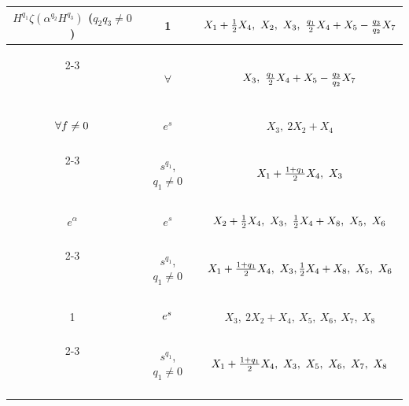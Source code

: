 \begin{center}
\begin{tabular}{|c|c|c|}
\hline


%


$H^{q_1}\zeta(\alpha^{q_2}H^{q_3})$ ($q_2q_3\ne0$) & 1 &


$\myrule X_1+\frac12 X_4,\ X_2,\ X_3,


\ \frac{q_1}{2}X_4+X_5-\frac{q_3}{q_2}X_7$ \\


\cline{2-3}


\ & $\forall$ & $\myrule X_3,\ \frac{q_1}{2}X_4+


X_5-\frac{q_3}{q_2}X_7$ \\


\hline


%


$\myrule \forall f\ne0$ & $e^s$ & $X_3,\ 2X_2+X_4$\\


\cline{2-3}


\ & $s^{q_1}$, $q_1\ne0$ & $\myrule X_1+\frac{1+q_1}{2}X_4,\ X_3$ \\


\hline


%


$e^\alpha$ & $e^s$ & $\myrule X_2+\frac12 X_4,\ X_3,


\ \frac12 X_4+X_8,\ X_5,\ X_6$\\


\cline{2-3}


\ & $s^{q_1}$, $q_1\ne0$ & $\myrule X_1+\frac{1+q_1}{2}X_4,


\ X_3, \frac12 X_4+X_8,\ X_5,\ X_6$ \\


\hline


%


1 & $\myrule e^s$ & $X_3,\ 2X_2+X_4,\ X_5,\ X_6,\ X_7,\ X_8$ \\


\cline{2-3}


\ & $s^{q_1}$, $q_1\ne0$ & $\myrule X_1+\frac{1+q_1}{2}X_4,


\ X_3,\ X_5,\ X_6,\ X_7,\ X_8$\\


\hline


%









\end{tabular}
\end{center}
